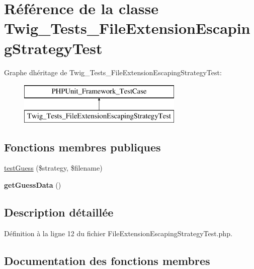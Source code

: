 \hypertarget{class_twig___tests___file_extension_escaping_strategy_test}{}\section{Référence de la classe Twig\+\_\+\+Tests\+\_\+\+File\+Extension\+Escaping\+Strategy\+Test}
\label{class_twig___tests___file_extension_escaping_strategy_test}
Graphe d\textquotesingle{}héritage de Twig\+\_\+\+Tests\+\_\+\+File\+Extension\+Escaping\+Strategy\+Test\+:\begin{figure}[H]
\begin{center}
\leavevmode
\includegraphics[height=2.000000cm]{class_twig___tests___file_extension_escaping_strategy_test}
\end{center}
\end{figure}
\subsection*{Fonctions membres publiques}
\begin{DoxyCompactItemize}
\item 
\hyperlink{class_twig___tests___file_extension_escaping_strategy_test_aea85e9ca95579bf168311fbfd94b5821}{test\+Guess} (\$strategy, \$filename)
\item 
{\bfseries get\+Guess\+Data} ()\hypertarget{class_twig___tests___file_extension_escaping_strategy_test_a85526ed4f8a171cb3529e431b22a9b85}{}\label{class_twig___tests___file_extension_escaping_strategy_test_a85526ed4f8a171cb3529e431b22a9b85}

\end{DoxyCompactItemize}


\subsection{Description détaillée}


Définition à la ligne 12 du fichier File\+Extension\+Escaping\+Strategy\+Test.\+php.



\subsection{Documentation des fonctions membres}
